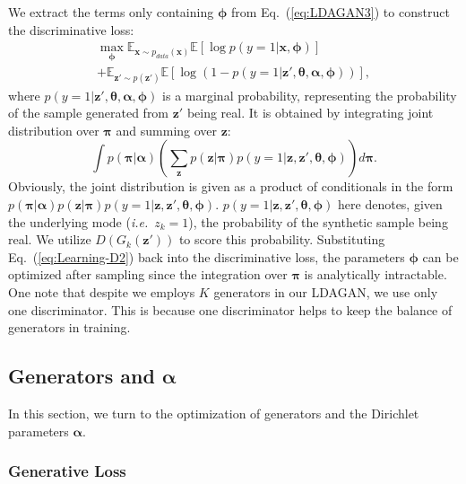 \documentclass{article}
\def\ie{\emph{i.e.}}
\begin{document}
We extract the terms only containing $\bm{\phi}$ from Eq.~(\ref{eq:LDAGAN3}) to construct the discriminative loss:
\begin{multline}
\label{eq:Learning-D1}
\max_{\bm{\phi}}
\mathbb{E}_{\mathbf{x} \sim p_{data}\left(\mathbf{x}\right)}
\mathbb{E}\left[ \log p\left( y=1 | \mathbf{x},\bm{\phi} \right) \right] \\
+\mathbb{E}_{\mathbf{z}' \sim p\left(\mathbf{z}'\right)}
\mathbb{E}\left[ \log\left( 1-p\left( y=1 | \mathbf{z}',\bm{\theta},\bm{\alpha},\bm{\phi} \right) \right) \right],
\end{multline}
where $p\left( y=1 | \mathbf{z}',\bm{\theta},\bm{\alpha},\bm{\phi} \right)$ is a marginal probability, representing the probability of the sample generated from $\mathbf{z}'$ being real.
It is obtained by integrating joint distribution over $\bm{\pi}$ and summing over $\mathbf{z}$:
\begin{equation}
\int p\left(\bm{\pi} | \bm{\alpha}\right)
\left(\sum_{\mathbf{z}}
p\left(\mathbf{z}|\bm{\pi}\right)
p\left(y=1|\mathbf{z}, \mathbf{z}', \bm{\theta}, \bm{\phi}\right)
\right)d\bm{\pi}.
\label{eq:Learning-D2}
\end{equation}
Obviously, the joint distribution is given as a product of conditionals in the form $p\left(\bm{\pi} | \bm{\alpha}\right)p\left(\mathbf{z}|\bm{\pi}\right)p\left(y=1|\mathbf{z}, \mathbf{z}', \bm{\theta}, \bm{\phi}\right)$.
$p\left(y=1|\mathbf{z}, \mathbf{z}', \bm{\theta}, \bm{\phi}\right)$ here denotes, given the underlying mode (\ie~$z_k=1$), the probability of the synthetic sample being real.
We utilize $ D\left(G_k\left(\mathbf{z}'\right)\right)$ to score this probability.
Substituting Eq.~(\ref{eq:Learning-D2}) back into the discriminative loss, the parameters $\bm{\phi}$ can be optimized after sampling since the integration over $\bm{\pi}$ is analytically intractable.
One note that despite we employs $K$ generators in our LDAGAN, we use only one discriminator.
This is because one discriminator helps to keep the balance of generators in training.

\subsection{Generators and $\bm{\alpha}$}
In this section, we turn to the optimization of generators and the Dirichlet parameters $\bm{\alpha}$.

\subsubsection{Generative Loss}
\label{sec:GeLoss}
\end{document}
